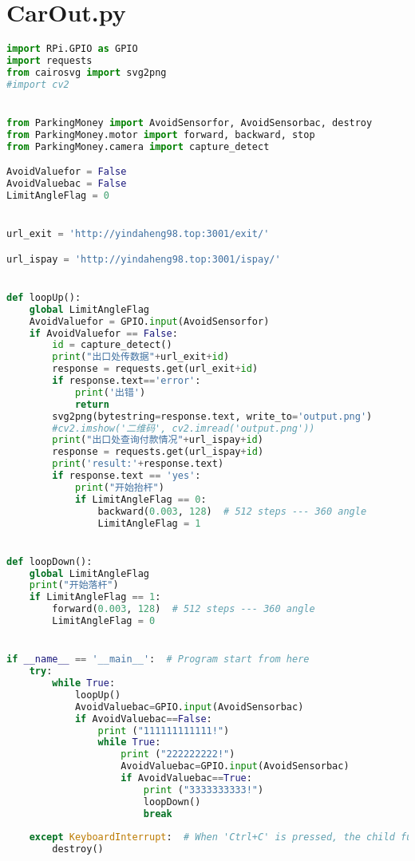 \section{CarOut.py}\label{apdx:CarOut.py}
\begin{lstlisting}[language=python]
import RPi.GPIO as GPIO
import requests
from cairosvg import svg2png
#import cv2


from ParkingMoney import AvoidSensorfor, AvoidSensorbac, destroy
from ParkingMoney.motor import forward, backward, stop
from ParkingMoney.camera import capture_detect

AvoidValuefor = False
AvoidValuebac = False
LimitAngleFlag = 0


url_exit = 'http://yindaheng98.top:3001/exit/'

url_ispay = 'http://yindaheng98.top:3001/ispay/'


def loopUp():
    global LimitAngleFlag
    AvoidValuefor = GPIO.input(AvoidSensorfor)
    if AvoidValuefor == False:
        id = capture_detect()
        print("出口处传数据"+url_exit+id)
        response = requests.get(url_exit+id)
        if response.text=='error':
            print('出错')
            return
        svg2png(bytestring=response.text, write_to='output.png')
        #cv2.imshow('二维码', cv2.imread('output.png'))
        print("出口处查询付款情况"+url_ispay+id)
        response = requests.get(url_ispay+id)
        print('result:'+response.text)
        if response.text == 'yes':
            print("开始抬杆")
            if LimitAngleFlag == 0:
                backward(0.003, 128)  # 512 steps --- 360 angle
                LimitAngleFlag = 1


def loopDown():
    global LimitAngleFlag
    print("开始落杆")
    if LimitAngleFlag == 1:
        forward(0.003, 128)  # 512 steps --- 360 angle
        LimitAngleFlag = 0


if __name__ == '__main__':  # Program start from here
    try:
        while True:
            loopUp()
            AvoidValuebac=GPIO.input(AvoidSensorbac)
            if AvoidValuebac==False:
                print ("111111111111!")
                while True:
                    print ("222222222!")
                    AvoidValuebac=GPIO.input(AvoidSensorbac)
                    if AvoidValuebac==True:
                        print ("3333333333!")
                        loopDown()
                        break
                       
    except KeyboardInterrupt:  # When 'Ctrl+C' is pressed, the child function destroy() will be  executed.
        destroy()
	\end{lstlisting}